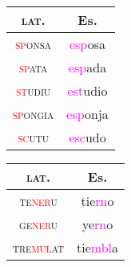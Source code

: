 \documentclass{report}
\begin{document}
\begin{tcolorbox}[title=Prothesis in /sC/]

\end{tcolorbox}

\begin{tabular}{c c}
  \textsc{lat.} & Es. \\
  \hline
  \textsc{\textcolor{red}{sp}onsa} & \textcolor{magenta}{esp}osa \\
  \textsc{\textcolor{red}{sp}ata} & \textcolor{magenta}{esp}ada \\
  \textsc{\textcolor{red}{st}udiu} & \textcolor{magenta}{est}udio \\
  \textsc{\textcolor{red}{sp}ongia} & \textcolor{magenta}{esp}onja \\
  \textsc{\textcolor{red}{sc}utu} & \textcolor{magenta}{esc}udo \\
\end{tabular}

\begin{tcolorbox}[title=Nasal Liquid Cluster from Syncope]
  
\end{tcolorbox}

\begin{tabular}{c c}
  \textsc{lat.} & Es. \\
  \hline
  \textsc{te\textcolor{red}{ner}u} & tie\textcolor{magenta}{rn}o \\
  \textsc{ge\textcolor{red}{ner}u} & ye\textcolor{magenta}{rn}o \\
  \textsc{tre\textcolor{red}{mul}at} & tie\textcolor{magenta}{mbl}a \\
\end{tabular}

\begin{tcolorbox}[title=Nasal Nasal Cluster from Syncope]
  
\end{tcolorbox}

\begin{tcolorbox}[title=Betacism]

\end{tcolorbox}

\begin{tcolorbox}[title=Deaspiration]
  
\end{tcolorbox}

\begin{tcolorbox}[title=Nasal Spirant Law]

\end{tcolorbox}
\end{document}
